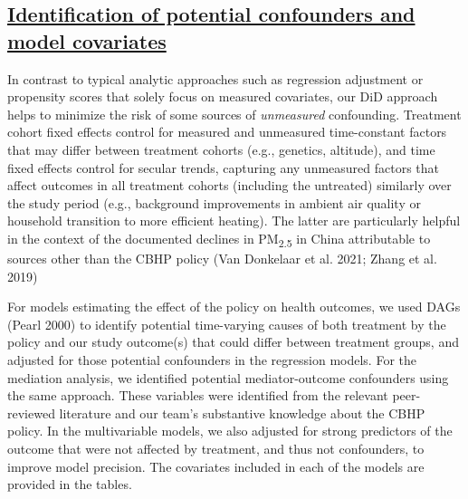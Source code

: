 \documentclass[
  letterpaper,
  DIV=11,
  numbers=noendperiod]{scrartcl}
\providecommand{\DIFadd}[1]{{\protect\color{blue}\underline{#1}}} %
\providecommand{\DIFaddbegin}{} %
\providecommand{\DIFaddend}{} %
\providecommand{\DIFdelbegin}{} %
\providecommand{\DIFdelend}{} %
\newcommand{\DIFscaledelfig}{0.5}
\newlength{\DIFdelgraphicswidth} %
\newlength{\DIFdelgraphicsheight} %
\newcommand{\DIFaddincludegraphics}[2][]{{\color{blue}\fbox{\DIFOincludegraphics[#1]{#2}}}} %
\newcommand{\DIFdelincludegraphics}[2][]{%
\sbox{\DIFdelgraphicsbox}{\DIFOincludegraphics[#1]{#2}}%
\settoboxwidth{\DIFdelgraphicswidth}{\DIFdelgraphicsbox} %
\settoboxtotalheight{\DIFdelgraphicsheight}{\DIFdelgraphicsbox} %
\scalebox{\DIFscaledelfig}{%
\parbox[b]{\DIFdelgraphicswidth}{\usebox{\DIFdelgraphicsbox}\\[-\baselineskip] \rule{\DIFdelgraphicswidth}{0em}}\llap{\resizebox{\DIFdelgraphicswidth}{\DIFdelgraphicsheight}{%
\setlength{\unitlength}{\DIFdelgraphicswidth}%
\begin{picture}(1,1)%
\thicklines\linethickness{2pt} %
{\color[rgb]{1,0,0}\put(0,0){\framebox(1,1){}}}%
{\color[rgb]{1,0,0}\put(0,0){\line( 1,1){1}}}%
{\color[rgb]{1,0,0}\put(0,1){\line(1,-1){1}}}%
\end{picture}%
}\hspace*{3pt}}} %
} %
\DeclareRobustCommand{\DIFaddbegin}{\DIFOaddbegin \let\includegraphics\DIFaddincludegraphics} %
\DeclareRobustCommand{\DIFaddend}{\DIFOaddend \let\includegraphics\DIFOincludegraphics} %
\DeclareRobustCommand{\DIFdelbegin}{\DIFOdelbegin \let\includegraphics\DIFdelincludegraphics} %
\DeclareRobustCommand{\DIFdelend}{\DIFOaddend \let\includegraphics\DIFOincludegraphics} %
\begin{document}
\DIFdelbegin %
\DIFdelend \DIFaddbegin \subsection{\DIFadd{Identification of potential confounders and model
covariates}}\label{identification-of-potential-confounders-and-model-covariates}
\DIFaddend 

In contrast to typical analytic approaches such as regression adjustment
or propensity scores that solely focus on measured covariates, our DiD
approach helps to minimize the risk of some sources of \emph{unmeasured}
confounding. Treatment cohort fixed effects control for measured and
unmeasured time-constant factors that may differ between treatment
cohorts (e.g., genetics, altitude), and time fixed effects control for
secular trends, capturing any unmeasured factors that affect outcomes in
all treatment cohorts (including the untreated) similarly over the study
period (e.g., background improvements in ambient air quality or
household transition to more efficient heating). The latter are
particularly helpful in the context of the documented declines in
PM\textsubscript{2.5} in China attributable to sources other than the
CBHP policy (Van Donkelaar et al. 2021; Zhang et al. 2019)

For models estimating the effect of the policy on health outcomes, we
used DAGs (Pearl 2000) to identify potential time-varying causes of both
treatment by the policy and our study outcome(s) that could differ
between treatment groups, and adjusted for those potential confounders
in the regression models. For the mediation analysis, we identified
potential mediator-outcome confounders using the same approach. These
variables were identified from the relevant peer-reviewed literature and
our team's substantive knowledge about the CBHP policy. In the
multivariable models, we also adjusted for strong predictors of the
outcome that were not affected by treatment, and thus not confounders,
to improve model precision. The covariates included in each of the
models are provided in the tables.
\end{document}
